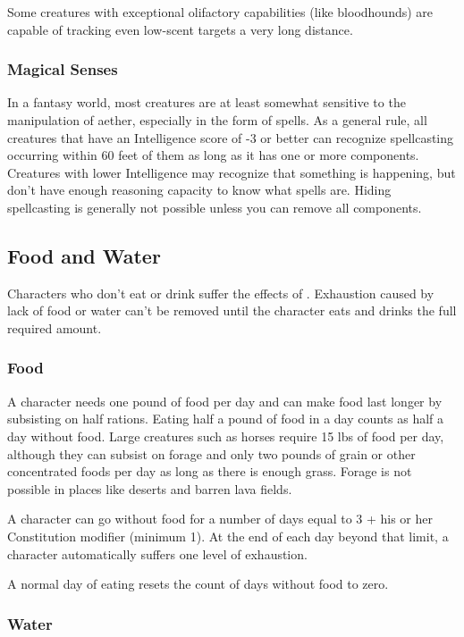 Some creatures with exceptional olifactory capabilities (like bloodhounds) are capable of tracking even low-scent targets a very long distance.

\subsubsection{Magical Senses}
In a fantasy world, most creatures are at least somewhat sensitive to the manipulation of aether, especially in the form of spells. As a general rule, all creatures that have an Intelligence score of -3 or better can recognize spellcasting occurring within 60 feet of them as long as it has one or more components. Creatures with lower Intelligence may recognize that something is happening, but don't have enough reasoning capacity to know what spells are. Hiding spellcasting is generally not possible unless you can remove all components.

\subsection{Food and Water}

Characters who don't eat or drink suffer the effects of . Exhaustion caused by lack of food or water can't be removed until the character eats and drinks the full required amount.

\subsubsection{Food}

A character needs one pound of food per day and can make food last longer by subsisting on half rations. Eating half a pound of food in a day counts as half a day without food. Large creatures such as horses require 15 lbs of food per day, although they can subsist on forage and only two pounds of grain or other concentrated foods per day as long as there is enough grass. Forage is not possible in places like deserts and barren lava fields.

A character can go without food for a number of days equal to 3 + his or her Constitution modifier (minimum 1). At the end of each day beyond that limit, a character automatically suffers one level of exhaustion.

A normal day of eating resets the count of days without food to zero.

\subsubsection{Water}

